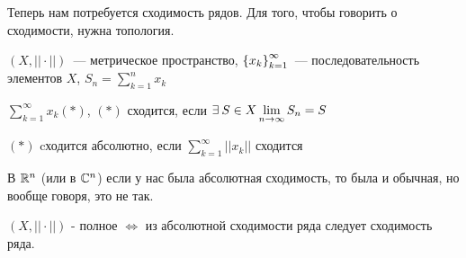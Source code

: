 \documentclass[document]{subfiles}
\begin{document}
Теперь нам потребуется сходимость рядов. Для того, чтобы говорить о сходимости, нужна топология.

\begin{definition}[Cходимость]
    $(X, || \cdot ||)$~--- метрическое пространство, $\left\{x_k\right\}^\infty_{k=1}$~--- последовательность элементов $X$, $S_n = \sum^n_{k=1} x_k $

    $\sum_{k=1}^\infty x_k (*)$, $(*)$ сходится, если $\exists S \in X \liml_{n \to \infty}{S_n} = S$

    $(*)$ cходится абсолютно, если $\sum^\infty_{k=1} ||x_k||$ сходится
\end{definition}
В $\mathbb{R}^n$ (или в $\mathbb{C}^n$) если у нас была абсолютная сходимость, то была и обычная, но вообще говоря, это не так.

\begin{theorem}
    $(X, || \cdot||)$ - полное $\Leftrightarrow$ из абсолютной сходимости ряда следует сходимость ряда.
\end{theorem}
\end{document}
